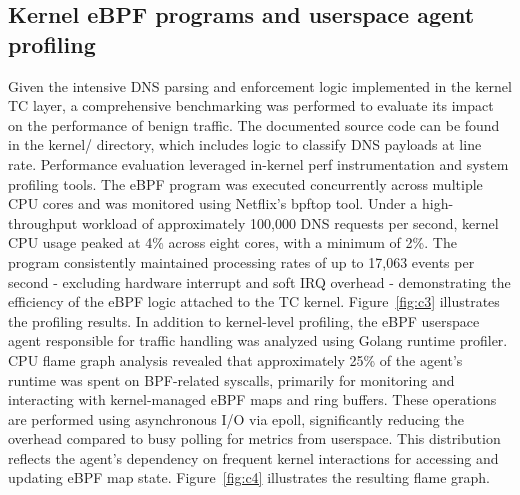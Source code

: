 \documentclass [11pt, proquest] {uwthesis}[2020/02/24]
\begin{document}
\subsection{Kernel eBPF programs and userspace agent profiling}
Given the intensive DNS parsing and enforcement logic implemented in the kernel TC layer, a comprehensive benchmarking was performed to evaluate its impact on the performance of benign traffic. The documented source code can be found in the kernel/ directory, which includes logic to classify DNS payloads at line rate. Performance evaluation leveraged in-kernel perf instrumentation and system profiling tools.
The eBPF program was executed concurrently across multiple CPU cores and was monitored using Netflix’s bpftop tool. Under a high-throughput workload of approximately 100,000 DNS requests per second, kernel CPU usage peaked at 4\% across eight cores, with a minimum of 2\%. The program consistently maintained processing rates of up to 17,063 events per second - excluding hardware interrupt and soft IRQ overhead - demonstrating the efficiency of the eBPF logic attached to the TC kernel. Figure~\ref{fig:c3} illustrates the profiling results.
In addition to kernel-level profiling, the eBPF userspace agent responsible for traffic handling was analyzed using Golang runtime profiler. CPU flame graph analysis revealed that approximately 25\% of the agent’s runtime was spent on BPF-related syscalls, primarily for monitoring and interacting with kernel-managed eBPF maps and ring buffers. These operations are performed using asynchronous I/O via epoll, significantly reducing the overhead compared to busy polling for metrics from userspace. This distribution reflects the agent’s dependency on frequent kernel interactions for accessing and updating eBPF map state. Figure~\ref{fig:c4} illustrates the resulting flame graph.



\end{document}
